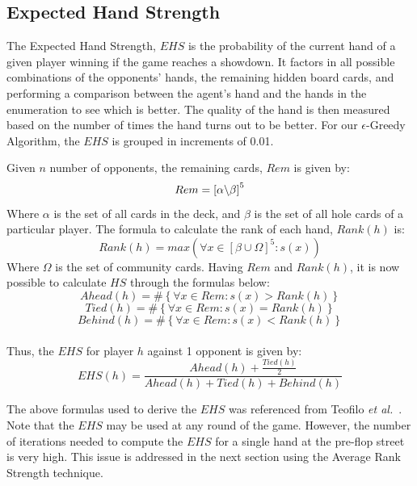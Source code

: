 \documentclass{article}
\begin{document}
\subsection{Expected Hand Strength}

The Expected Hand Strength, $EHS$ is the probability of the current hand of a given player winning if the game reaches a showdown. It factors in all possible combinations of the opponents' hands, the remaining hidden board cards, and performing a comparison between the agent's hand and the hands in the enumeration to see which is better. The quality of the hand is then measured based on the number of times the hand turns out to be better. For our $\epsilon$-Greedy Algorithm, the $EHS$ is grouped in increments of 0.01. 

Given $n$ number of opponents, the remaining cards, $Rem$ is given by:
\begin{displaymath}
  Rem = \left[ \alpha \char`\\ \beta \right]^{5}
\end{displaymath}
Where $\alpha$ is the set of all cards in the deck, and $\beta$ is the set of all hole cards of a particular player. The formula to calculate the rank of each hand, $Rank(h)$ is:
\begin{displaymath}
  Rank(h) = max({\forall x \in [\beta \cup \Omega]^{5} : s(x)})
\end{displaymath}
Where $\Omega$ is the set of community cards.
Having $Rem$ and $Rank(h)$, it is now possible to calculate $HS$ through the formulas below:
\begin{displaymath}
  Ahead(h) = \# \left\lbrace \forall x \in Rem:s(x) > Rank(h) \right\rbrace
\end{displaymath}
\begin{displaymath}
  Tied(h) = \# \left\lbrace \forall x \in Rem:s(x) = Rank(h) \right\rbrace
\end{displaymath}
\begin{displaymath}
  Behind(h) = \# \left\lbrace \forall x \in Rem:s(x) < Rank(h) \right\rbrace
\end{displaymath}\\
Thus, the $EHS$ for player $h$ against 1 opponent is given by:
\begin{displaymath}
  EHS(h)= \frac{Ahead(h)+\frac{Tied(h)}{2}}{Ahead(h) + Tied(h) + Behind(h)}
\end{displaymath}

\noindent The above formulas used to derive the $EHS$ was referenced from Teofilo \textit{et al.}~. Note that the $EHS$ may be used at any round of the game. However, the number of iterations needed to compute the $EHS$ for a single hand at the pre-flop street is very high. This issue is addressed in the next section using the Average Rank Strength technique.
\end{document}
